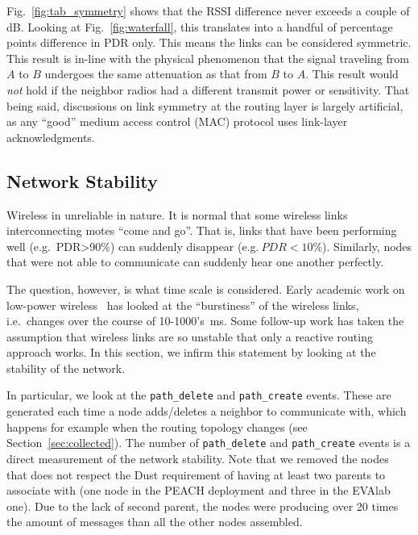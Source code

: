 \documentclass{elsarticle}
\newcommand{\pathcreate}          {{\tt path\_create}\xspace}
\newcommand{\pathdelete}          {{\tt path\_delete}\xspace}
\begin{document}

Fig.~\ref{fig:tab_symmetry} shows that the RSSI difference never exceeds a couple of dB.
Looking at Fig.~\ref{fig:waterfall}, this translates into a handful of percentage points difference in PDR only.
This means the links can be considered symmetric.
This result is in-line with the physical phenomenon that the signal traveling from $A$ to $B$ undergoes the same attenuation as that from $B$ to $A$.
This result would \textit{not} hold if the neighbor radios had a different transmit power or sensitivity.
That being said, discussions on link symmetry at the routing layer is largely artificial, as any ``good'' medium access control (MAC) protocol uses link-layer acknowledgments.

\subsection{Network Stability}
\label{sec:net_stability}


Wireless in unreliable in nature.
It is normal that some wireless links interconnecting motes ``come and go''.
That is, links that have been performing well (e.g.~PDR>90\%) can suddenly disappear (e.g.$~PDR<10$\%).
Similarly, nodes that were not able to communicate can suddenly hear one another perfectly.


The question, however, is what time scale is considered.
Early academic work on low-power wireless~\cite{srinivasan08beta} has looked at the ``burstiness'' of the wireless links, i.e.~changes over the course of 10-1000's~ms.
Some follow-up work has taken the assumption that wireless links are so unstable that only a reactive routing approach works.
In this section, we infirm this statement by looking at the stability of the network.


In particular, we look at the \pathdelete and \pathcreate events.
These are generated each time a node adds/deletes a neighbor to communicate with, which happens for example when the routing topology changes (see Section~\ref{sec:collected}).
The number of \pathdelete and \pathcreate events is a direct measurement of the network stability.
Note that we removed the nodes that does not respect the Dust requirement of having at least two parents to associate with (one node in the PEACH deployment and three in the EVAlab one).
Due to the lack of second parent, the nodes were producing over 20 times the amount of messages than all the other nodes assembled.
\end{document}
